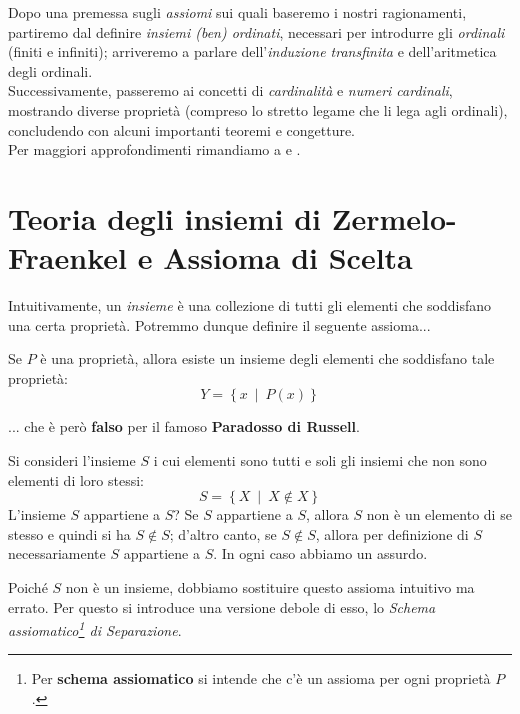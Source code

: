 Dopo una premessa sugli \textit{assiomi} sui quali baseremo i nostri ragionamenti, partiremo dal definire \textit{insiemi (ben) ordinati}, necessari per introdurre gli \textit{ordinali} (finiti e infiniti); arriveremo a parlare dell'\textit{induzione transfinita} e dell'aritmetica degli ordinali.\\
Successivamente, passeremo ai concetti di \textit{cardinalità} e \textit{numeri cardinali}, mostrando diverse proprietà (compreso lo stretto legame che li lega agli ordinali), concludendo con alcuni importanti teoremi e congetture.\\
Per maggiori approfondimenti rimandiamo a \cite{jech:2003settheory} e \cite{andretta:2021elements}.
\section{Teoria degli insiemi di Zermelo-Fraenkel e Assioma di Scelta}
Intuitivamente, un \textit{insieme} è una collezione di tutti gli elementi che soddisfano una certa proprietà. Potremmo dunque definire il seguente assioma...
\begin{falseaxiom}
	Se $P$ è una proprietà, allora esiste un insieme degli elementi che soddisfano tale proprietà:
	\begin{equation*}
		Y=\left\{x \ \middle| \ P\left(x\right)\right\}
	\end{equation*}
\end{falseaxiom}
... che è però \textbf{falso} per il famoso \textbf{Paradosso di Russell}.
\begin{examplewt}
	Si consideri l'insieme $S$ i cui elementi sono tutti e soli gli insiemi che non sono elementi di loro stessi:
	\begin{equation*}
		S=\left\{X \ \middle| \ X\notin X\right\}
	\end{equation*}
L'insieme $S$ appartiene a $S$? Se $S$ appartiene a $S$, allora $S$ non è un elemento di se stesso e quindi si ha $S\notin S$; d'altro canto, se $S\notin S$, allora per definizione di $S$ necessariamente $S$ appartiene a $S$. In ogni caso abbiamo un assurdo.
\end{examplewt}
Poiché $S$ non è un insieme, dobbiamo sostituire questo assioma intuitivo ma errato. Per questo si introduce una versione debole di esso, lo \textit{Schema assiomatico\footnote{Per \textbf{schema assiomatico} si intende che c'è un assioma per ogni proprietà $P$.} di Separazione}.
